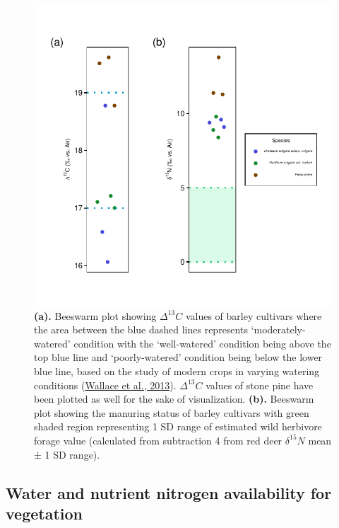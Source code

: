 \documentclass[preprint, 3p, authoryear]{elsarticle} %
\begin{document}
\begin{figure}
\centering
\includegraphics{RPaladugu_Castro_files/figure-latex/iso-hord-plots-1.pdf}
\caption{\label{fig:iso-hord-plots}\textbf{(a).} Beeswarm plot showing \(\Delta ^{13}C\) values of barley cultivars where the area between the blue dashed lines represents `moderately-watered' condition with the `well-watered' condition being above the top blue line and `poorly-watered' condition being below the lower blue line, based on the study of modern crops in varying watering conditions (\protect\hyperlink{ref-wallace_etal13}{Wallace et al., 2013}). \(\Delta ^{13}C\) values of stone pine have been plotted as well for the sake of visualization. \textbf{(b).} Beeswarm plot showing the manuring status of barley cultivars with green shaded region representing 1 SD range of estimated wild herbivore forage value (calculated from subtraction 4 \text{\textperthousand} from red deer \(\delta ^{15}N\) mean ± 1 SD range).}
\end{figure}

\hypertarget{water-and-nutrient-nitrogen-availability-for-vegetation}{%
\subsection{Water and nutrient nitrogen availability for vegetation}\label{water-and-nutrient-nitrogen-availability-for-vegetation}}
\end{document}
